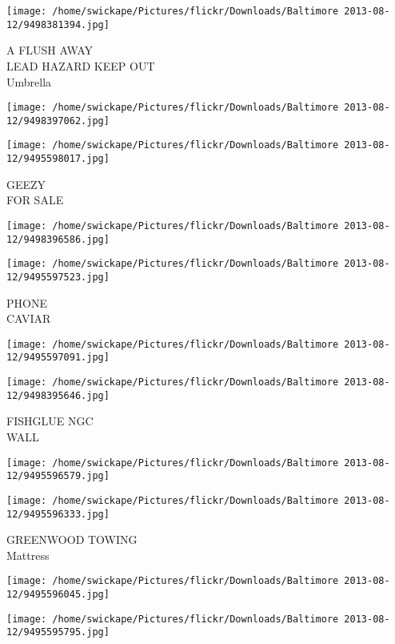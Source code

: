 \documentclass[10pt,letterpaper]{article}
\begin{document}
\texttt{[image: /home/swickape/Pictures/flickr/Downloads/Baltimore 2013-08-12/9498381394.jpg]}

A FLUSH AWAY\\
LEAD HAZARD KEEP OUT\\
Umbrella
\pagebreak

\texttt{[image: /home/swickape/Pictures/flickr/Downloads/Baltimore 2013-08-12/9498397062.jpg]}

\vspace{0.25in}
\texttt{[image: /home/swickape/Pictures/flickr/Downloads/Baltimore 2013-08-12/9495598017.jpg]}

GEEZY\\
FOR SALE
\pagebreak

\texttt{[image: /home/swickape/Pictures/flickr/Downloads/Baltimore 2013-08-12/9498396586.jpg]}

\vspace{0.25in}
\texttt{[image: /home/swickape/Pictures/flickr/Downloads/Baltimore 2013-08-12/9495597523.jpg]}

PHONE\\
CAVIAR
\pagebreak

\texttt{[image: /home/swickape/Pictures/flickr/Downloads/Baltimore 2013-08-12/9495597091.jpg]}

\vspace{0.25in}
\texttt{[image: /home/swickape/Pictures/flickr/Downloads/Baltimore 2013-08-12/9498395646.jpg]}

FISHGLUE NGC\\
WALL
\pagebreak

\texttt{[image: /home/swickape/Pictures/flickr/Downloads/Baltimore 2013-08-12/9495596579.jpg]}

\vspace{0.25in}
\texttt{[image: /home/swickape/Pictures/flickr/Downloads/Baltimore 2013-08-12/9495596333.jpg]}

GREENWOOD TOWING\\
Mattress
\pagebreak

\texttt{[image: /home/swickape/Pictures/flickr/Downloads/Baltimore 2013-08-12/9495596045.jpg]}

\vspace{0.25in}
\texttt{[image: /home/swickape/Pictures/flickr/Downloads/Baltimore 2013-08-12/9495595795.jpg]}
\end{document}
